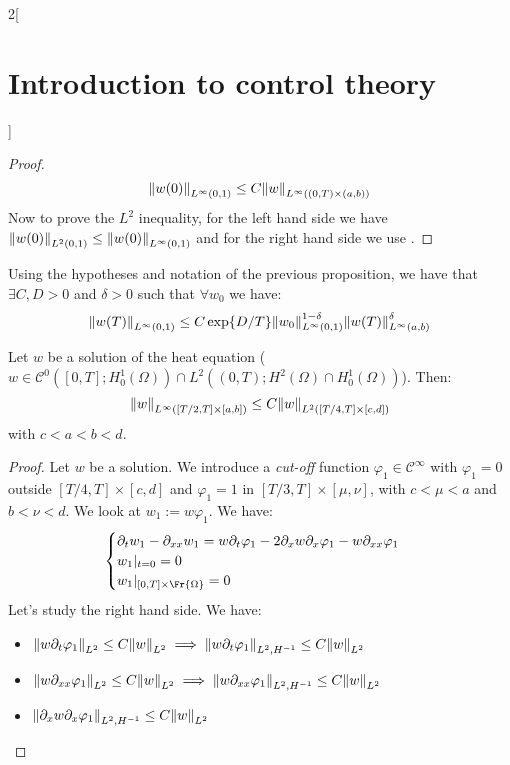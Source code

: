 \documentclass[../../../main_math.tex]{subfiles}
\begin{document}
\begin{multicols}{2}[\section{Introduction to control theory}]
\begin{proof}
    $$
      \norm{w(0)}_{L^\infty (0,1)}\leq C\norm{w}_{L^\infty((0,T)\times (a,b))}
    $$
    Now to prove the $L^2$ inequality, for the left hand side we have $\norm{w(0)}_{L^2(0,1)}\leq \norm{w(0)}_{L^\infty(0,1)}$ and for the right hand side we use .
  \end{proof}
  \begin{lemma}\label{ICT:lemma1Dobservability}
    Using the hypotheses and notation of the previous proposition, we have that $\exists C,D>0$ and $\delta>0$ such that $\forall w_0$ we have:
    $$
      \norm{w(T)}_{L^\infty(0,1)}\leq C\exp{D/T}\norm{w_0}_{L^\infty(0,1)}^{1-\delta}\norm{w(T)}_{L^\infty(a,b)}^\delta
    $$
  \end{lemma}
  \begin{lemma}\label{ICT:interiorregularity}
    Let $w$ be a solution of the heat equation ($w\in \mathcal{C}^0([0,T]; H_0^1(\Omega))\cap L^2((0,T); H^2(\Omega)\cap H_0^1(\Omega))$). Then:
    $$
      \norm{w}_{L^\infty([T/2,T]\times [a,b])}\leq C\norm{w}_{L^2([T/4,T] \times [c,d])}
    $$
    with $c<a<b<d$.
  \end{lemma}
  \begin{proof}
    Let $w$ be a solution. We introduce a \textit{cut-off} function $\varphi_1\in\mathcal{C}^\infty$ with $\varphi_1=0$ outside $[T/4,T]\times [c,d]$ and $\varphi_1=1$ in $[T/3,T]\times [\mu,\nu]$, with $c<\mu<a$ and $b<\nu<d$. We look at $w_1:=w\varphi_1$. We have:
    $$
      \begin{cases}
        \partial_t w_1 - \partial_{xx}w_1=w\partial_t\varphi_1-2\partial_x w\partial_x\varphi_1-w\partial_{xx}\varphi_1 \\
        w_1|_{t=0} = 0                                                                                                  \\
        w_1|_{[0,T]\times\Fr{\Omega}}=0
      \end{cases}
    $$
    Let's study the right hand side. We have:
    \begin{itemize}
      \item $\norm{w\partial_t\varphi_1}_{L^2}\leq C \norm{w}_{L^2}\implies \norm{w\partial_t\varphi_1}_{L^2,H^{-1}}\leq C \norm{w}_{L^2}$
      \item $\norm{w\partial_{xx}\varphi_1}_{L^2}\leq C \norm{w}_{L^2} \implies \norm{w\partial_{xx}\varphi_1}_{L^2,H^{-1}}\leq C \norm{w}_{L^2}$
      \item $\norm{\partial_x w\partial_x\varphi_1}_{L^2,H^{-1}}\leq C \norm{w}_{L^2}$

\end{itemize}
\end{proof}
\end{multicols}
\end{document}
